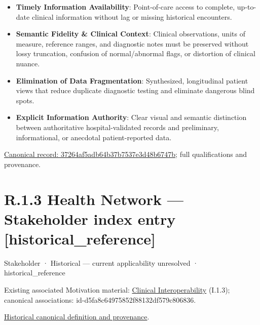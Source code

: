 \begin{itemize}


\item \textbf{Timely Information Availability}: Point-of-care access to complete, up-to-date clinical information without lag or missing historical encounters.

\item \textbf{Semantic Fidelity \& Clinical Context}: Clinical observations, units of measure, reference ranges, and diagnostic notes must be preserved without lossy truncation, confusion of normal/abnormal flags, or distortion of clinical nuance.

\item \textbf{Elimination of Data Fragmentation}: Synthesized, longitudinal patient views that reduce duplicate diagnostic testing and eliminate dangerous blind spots.

\item \textbf{Explicit Information Authority}: Clear visual and semantic distinction between authoritative hospital-validated records and preliminary, informational, or anecdotal patient-reported data.

\end{itemize}

{\footnotesize \href{../../../../../../../continuum/motivation/stakeholder/37264af5adb64b37b7537e3d48b6747b.md}{Canonical record: 37264af5adb64b37b7537e3d48b6747b}; full qualifications and provenance.}\par
\section*{R.1.3 Health Network — Stakeholder index entry [historical\_reference]}
\label{navigation:R.1.3}

\label{element:55e57c01dfe146a2a225228b31196862}
{\small Stakeholder · Historical — current applicability unresolved · historical\_reference}\par
{\small Existing associated Motivation material: \hyperref[element:babb9f5d63d8435890c1db3579ec78d9]{Clinical Interoperability} (I.1.3); canonical associations: id-d5fa8c64975852f88132df579c806836.}\par
\href{../../../../../../../continuum/motivation/stakeholder/55e57c01dfe146a2a225228b31196862.md}{Historical canonical definition and provenance}.\par
